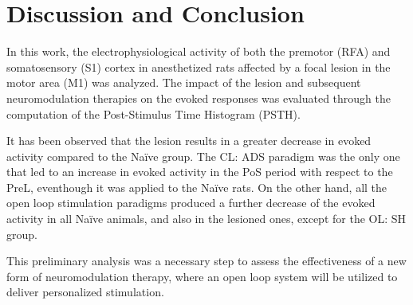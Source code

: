 \clearpage
\section{Discussion and Conclusion}

In this work, the electrophysiological activity of both the premotor (RFA) and somatosensory (S1) cortex in anesthetized rats affected by a focal lesion in the motor area (M1) was analyzed. The impact of the lesion and subsequent neuromodulation therapies on the evoked responses was evaluated through the computation of the Post-Stimulus Time Histogram (PSTH).

It has been observed that the lesion results in a greater decrease in evoked activity compared to the Naïve group. The CL: ADS paradigm was the only one that led to an increase in evoked activity in the PoS period with respect to the PreL, eventhough it was applied to the Naïve rats. On the other hand, all the open loop stimulation paradigms produced a further decrease of the evoked activity in all Naïve animals, and also in the lesioned ones, except for the OL: SH group.

This preliminary analysis was a necessary step to assess the effectiveness of a new form of neuromodulation therapy, where an open loop system will be utilized to deliver personalized stimulation.
